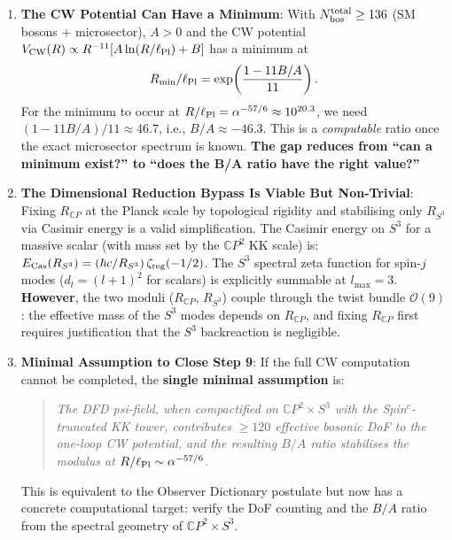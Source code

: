 \documentclass[11pt,a4paper]{article}
\newcommand{\CP}{\mathbb{C}P}
\newcommand{\lPl}{\ell_{\rm Pl}}
\newcommand{\alphafine}{\alpha}
\newcommand{\Nbos}{N_{\rm bos}}
\begin{document}
\begin{tcolorbox}[colback=yellow!5!white, colframe=red!70!black,
  title=\textbf{TOP 5 FINDINGS --- WAVE 4, ITERATION 11}]
\begin{enumerate}
\item \textbf{The CW Potential Can Have a Minimum}: With $\Nbos^{\rm total}
  \geq 136$ (SM bosons + microsector), $A > 0$ and the CW potential
  $V_{\rm CW}(R) \propto R^{-11}[A\ln(R/\lPl) + B]$ has a minimum at
  \begin{equation*}
  R_{\rm min}/\lPl = \exp\!\left(\frac{1 - 11B/A}{11}\right).
  \end{equation*}
  For the minimum to occur at $R/\lPl = \alphafine^{-57/6}
  \approx 10^{20.3}$, we need $(1 - 11B/A)/11 \approx 46.7$,
  i.e., $B/A \approx -46.3$. This is a \emph{computable} ratio
  once the exact microsector spectrum is known. \textbf{The gap
  reduces from ``can a minimum exist?'' to ``does the B/A ratio
  have the right value?''}

\item \textbf{The Dimensional Reduction Bypass Is Viable But Non-Trivial}:
  Fixing $R_{\CP}$ at the Planck scale by topological rigidity and
  stabilising only $R_{S^3}$ via Casimir energy is a valid
  simplification. The Casimir energy on $S^3$ for a massive
  scalar (with mass set by the $\CP^2$ KK scale) is:
  $E_{\rm Cas}(R_{S^3}) = (\hbar c/R_{S^3})\,\zeta_{\rm reg}(-1/2)$.
  The $S^3$ spectral zeta function for spin-$j$ modes
  ($d_l = (l+1)^2$ for scalars) is explicitly summable at
  $l_{\max} = 3$. \textbf{However}, the two moduli
  ($R_{\CP}$, $R_{S^3}$) couple through the twist bundle
  $\mathcal{O}(9)$: the effective mass of the $S^3$ modes
  depends on $R_{\CP}$, and fixing $R_{\CP}$ first requires
  justification that the $S^3$ backreaction is negligible.

\item \textbf{Minimal Assumption to Close Step 9}: If the full CW
  computation cannot be completed, the \textbf{single minimal
  assumption} is:
  \begin{quote}
  \textit{The DFD psi-field, when compactified on $\CP^2 \times S^3$
  with the Spin$^c$-truncated KK tower, contributes $\geq 120$
  effective bosonic DoF to the one-loop CW potential, and the
  resulting $B/A$ ratio stabilises the modulus at
  $R/\lPl \sim \alphafine^{-57/6}$.}
  \end{quote}
  This is equivalent to the Observer Dictionary postulate but now
  has a concrete computational target: verify the DoF counting and
  the $B/A$ ratio from the spectral geometry of $\CP^2 \times S^3$.
\end{enumerate}

\end{tcolorbox}
\end{document}
